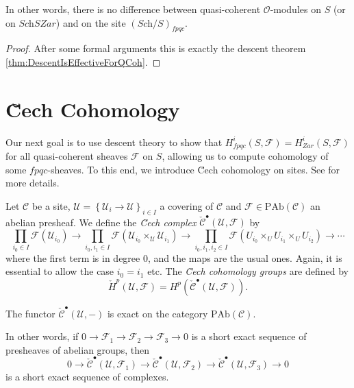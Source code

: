 \noindent
In other words, there is no difference between quasi-coherent 
$\mathcal{O}$-modules on $S$ (or on $\textit{Sch}SZar$) and on the site 
$(\textit{Sch}/S)_{fpqc}$.
  
\begin{proof} 
After some formal arguments this is exactly the descent theorem 
\ref{thm:DescentIsEffectiveForQCoh}.
\end{proof}
  
\section{\u Cech Cohomology}
\label{section-cech-cohomology}

\noindent
Our next goal is to use descent theory to show that $H_{fpqc}^i(S, \mathcal{F}) 
= H_{Zar}^i(S, \mathcal{F})$ for all quasi-coherent  sheaves $\mathcal{F}$ on 
$S$, allowing us to compute cohomology of some $fpqc$-sheaves.  To this end, we 
introduce \u Cech cohomology on sites. See \cite{ArtinTopologies} for more 
details.
 
\begin{definition} 
Let $\mathcal{C}$ be a site, $\mathcal{U}=\left\{\mathcal{U}_i\to 
\mathcal{U}\right\}_{i\in I}$ a covering of $\mathcal{C}$ and $\mathcal{F}\in 
\text{PAb}(\mathcal{C})$ an abelian presheaf. We define the \emph{\u Cech 
complex} $\check{\mathcal{C}}^\bullet(\mathcal{U}, \mathcal{F})$ by 
$$ 
 \prod_{i_0\in I}\mathcal{F}(\mathcal{U}_{i_0}) \to \prod_{i_0, 
i_1\in I}\mathcal{F}\left(\mathcal{U}_{i_0}\times_{\mathcal{U}} 
\mathcal{U}_{i_1}\right) \to \prod_{i_0, i_1, i_2 \in I} 
\mathcal{F}\left(U_{i_0}\times_U U_{i_1} \times_U U_{i_2}\right) \to \cdots
$$
where the first term is in degree 0, and the maps are the usual ones. Again, it 
is essential to allow the case $i_0 = i_1$ etc. The \emph{\u Cech cohomology 
groups} are defined by
$$
\check{H}^p(\mathcal{U}, \mathcal{F})= 
H^p(\check{\mathcal{C}}^\bullet\left(\mathcal{U}, \mathcal{F}\right)).
$$
\end{definition}

\begin{lemma} 
The functor $\check{\mathcal{C}}^\bullet(\mathcal{U}, -)$ is exact on the 
category $\text{PAb}(\mathcal{C})$. 
\end{lemma}	
  
\noindent
In other words, if $0\to \mathcal{F}_1\to \mathcal{F}_2\to \mathcal{F}_3\to 0$ 
is a short exact sequence of presheaves of abelian groups, then  
$$
0 \to \check{\mathcal{C}}^\bullet\left(\mathcal{U}, \mathcal{F}_1\right) 
\to\check{\mathcal{C}}^\bullet(\mathcal{U}, \mathcal{F}_2) \to 
\check{\mathcal{C}}^\bullet(\mathcal{U}, \mathcal{F}_3)\to 0 
$$
is a short exact sequence of complexes.
  

